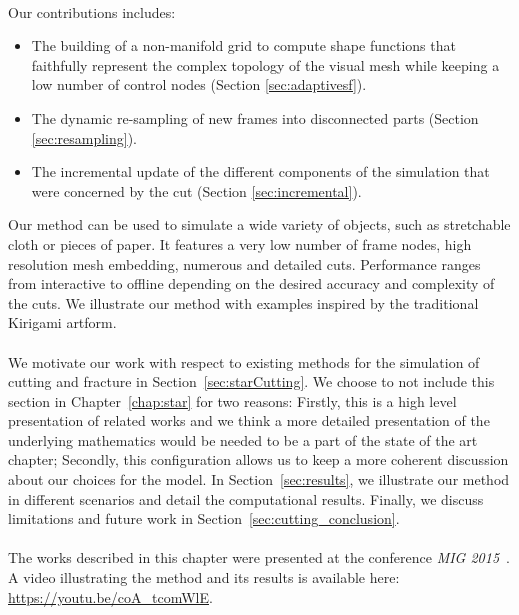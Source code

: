 \paragraph*{}
Our contributions includes:
\begin{itemize}
\item The building of a non-manifold grid to compute shape functions that faithfully represent the complex topology of the visual mesh while keeping a low number of control nodes (Section \ref{sec:adaptivesf}).
\item The dynamic re-sampling of new frames into disconnected parts (Section \ref{sec:resampling}).
\item The incremental update of the different components of the simulation that were concerned by the cut (Section \ref{sec:incremental}).
\end{itemize}

Our method can be used to simulate a wide variety of objects, such as stretchable cloth or pieces of paper. 
It features a very low number of frame nodes, high resolution mesh embedding, numerous and detailed cuts. 
Performance ranges from interactive to offline depending on the desired accuracy and complexity of the cuts.
We illustrate our method with examples inspired by the traditional Kirigami artform.
\paragraph*{}
We motivate our work with respect to existing methods for the simulation of cutting and fracture in Section~\ref{sec:starCutting}.
We choose to not include this section in Chapter~\ref{chap:star} for two reasons:
Firstly, this is a high level presentation of related works and we think a more detailed presentation of the underlying mathematics would be needed to be a part of the state of the art chapter;
Secondly, this configuration allows us to keep a more coherent discussion about our choices for the model.
In Section~\ref{sec:results}, we illustrate our method in different scenarios and detail the computational results. 
Finally, we discuss limitations and future work in Section~\ref{sec:cutting_conclusion}. 
\paragraph*{}
The works described in this chapter were presented at the conference \emph{MIG 2015}~\cite{Manteaux2015}.
A video illustrating the method and its results is available here: \url{https://youtu.be/coA_tcomWlE}.
